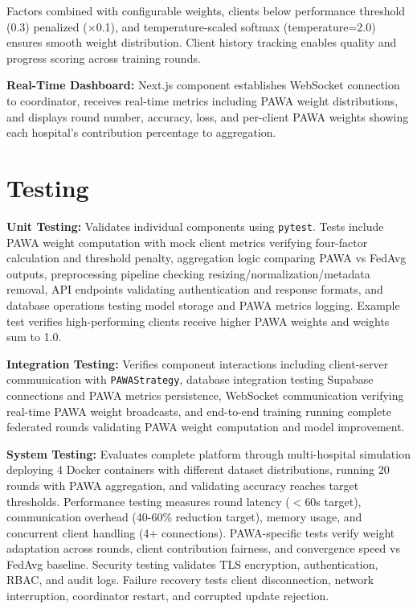 Factors combined with configurable weights, clients below performance threshold (0.3) penalized ($\times$0.1), and temperature-scaled softmax (temperature=2.0) ensures smooth weight distribution. Client history tracking enables quality and progress scoring across training rounds.

\textbf{Real-Time Dashboard:} Next.js component establishes WebSocket connection to coordinator, receives real-time metrics including PAWA weight distributions, and displays round number, accuracy, loss, and per-client PAWA weights showing each hospital's contribution percentage to aggregation.

\section{Testing}

\textbf{Unit Testing:} Validates individual components using \texttt{pytest}. Tests include PAWA weight computation with mock client metrics verifying four-factor calculation and threshold penalty, aggregation logic comparing PAWA vs FedAvg outputs, preprocessing pipeline checking resizing/normalization/metadata removal, API endpoints validating authentication and response formats, and database operations testing model storage and PAWA metrics logging. Example test verifies high-performing clients receive higher PAWA weights and weights sum to 1.0.

\textbf{Integration Testing:} Verifies component interactions including client-server communication with \texttt{PAWAStrategy}, database integration testing Supabase connections and PAWA metrics persistence, WebSocket communication verifying real-time PAWA weight broadcasts, and end-to-end training running complete federated rounds validating PAWA weight computation and model improvement.

\textbf{System Testing:} Evaluates complete platform through multi-hospital simulation deploying 4 Docker containers with different dataset distributions, running 20 rounds with PAWA aggregation, and validating accuracy reaches target thresholds. Performance testing measures round latency ($<$60s target), communication overhead (40-60\% reduction target), memory usage, and concurrent client handling (4+ connections). PAWA-specific tests verify weight adaptation across rounds, client contribution fairness, and convergence speed vs FedAvg baseline. Security testing validates TLS encryption, authentication, RBAC, and audit logs. Failure recovery tests client disconnection, network interruption, coordinator restart, and corrupted update rejection.

